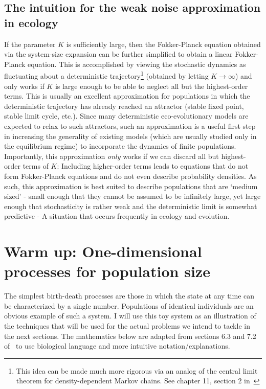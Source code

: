 \subsection{The intuition for the weak noise approximation in ecology}
If the parameter $K$ is sufficiently large, then the Fokker-Planck equation obtained via the system-size expansion can be further simplified to obtain a linear Fokker-Planck equation. This is accomplished by viewing the stochastic dynamics as fluctuating about a deterministic trajectory\footnote{This idea can be made much more rigorous via an analog of the central limit theorem for density-dependent Markov chains. See chapter 11, section 2 in~\citet{ethier_markov_1986}} (obtained by letting $K \to \infty$) and only works if $K$ is large enough to be able to neglect all but the highest-order terms. This is usually an excellent approximation for populations in which the deterministic trajectory has already reached an attractor (stable fixed point, stable limit cycle, etc.). Since many deterministic eco-evolutionary models are expected to relax to such attractors, such an approximation is a useful first step in increasing the generality of existing models (which are usually studied only in the equilibrium regime) to incorporate the dynamics of finite populations. Importantly, this approximation \emph{only} works if we can discard all but highest-order terms of $K$: Including higher-order terms leads to equations that do not form Fokker-Planck equations and do not even describe probability densities. As such, this approximation is best suited to describe populations that are `medium sized' - small enough that they cannot be assumed to be infinitely large, yet large enough that stochasticity is rather weak and the deterministic limit is somewhat predictive - A situation that occurs frequently in ecology and evolution.

\section{Warm up: One-dimensional processes for population size}\label{sec_1D_processes}
The simplest birth-death processes are those in which the state at any time can be characterized by a single number. Populations of identical individuals are an obvious example of such a system. I will use this toy system as an illustration of the techniques that will be used for the actual problems we intend to tackle in the next sections. The mathematics below are adapted from sections 6.3 and 7.2 of~\citet{gardiner_stochastic_2009} to use biological language and more intuitive notation/explanations.

